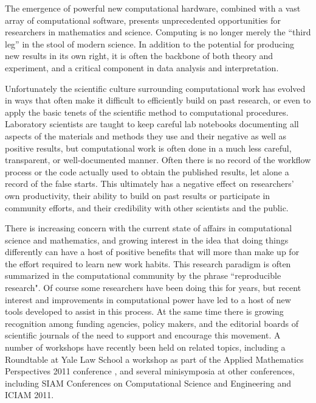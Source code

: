\documentclass[11pt]{article}
\begin{document}
The emergence of powerful new computational hardware, combined with
a vast array of computational software, presents unprecedented
opportunities for researchers in mathematics and science.  Computing
is no longer merely the “third leg” in the stool of modern science.
In addition to the potential for producing new results in its own
right, it is often the backbone of both theory and experiment, and
a critical component in data analysis and interpretation.

Unfortunately the scientific culture surrounding computational work
has evolved in ways that often make it difficult to efficiently
build on past research, or even to apply the basic tenets of the
scientific method to computational procedures.  Laboratory scientists
are taught to keep careful lab notebooks documenting all aspects
of the materials and methods they use and their negative as well
as positive results, but computational work is often done in a much
less careful, transparent, or well-documented manner. Often there
is no record of the workflow process or the code actually used to
obtain the published results, let alone a record of the false starts.
This ultimately has a negative effect on researchers' own productivity,
their ability to build on past results or participate in community
efforts, and their credibility with other scientists and the public.

There is increasing concern with the current state of affairs in
computational science and mathematics, and growing interest in the
idea that doing things differently can have a host of positive
benefits that will more than make up for the effort required to
learn new work habits.  This research paradigm is often summarized
in the computational community by the phrase ``reproducible research".
Of course some researchers have been doing this for years, but
recent interest and improvements in computational power have led
to a host of new tools developed to assist in this process.  At the
same time there is growing recognition among funding agencies,
policy makers, and the editorial boards of scientific journals 
of the need to support and encourage this movement.
A number of workshops have recently been held on related topics, including a
Roundtable at Yale Law School \cite{??} 
a workshop as part of the Applied Mathematics Perspectives 2011 conference
\cite{??}, 
and several minisymposia at other
conferences, including SIAM Conferences on Computational Science and
Engineering and ICIAM 2011.
\end{document}
